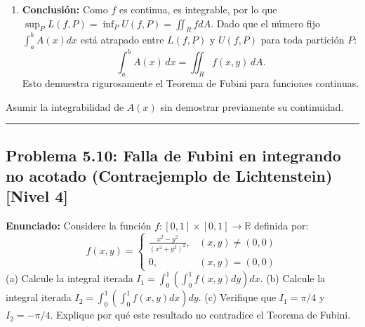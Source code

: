 \documentclass[11pt,a4paper]{article}
\begin{document}
\begin{enumerate}[label=\textbf{\arabic*.}]
\item \textbf{Conclusión:}
Como $f$ es continua, es integrable, por lo que $\sup_P L(f, P) = \inf_P U(f, P) = \iint_R f dA$.
Dado que el número fijo $\int_a^b A(x) dx$ está atrapado entre $L(f,P)$ y $U(f,P)$ para toda partición $P$:
\begin{equation*}
\int_a^b A(x) \, dx = \iint_R f(x,y) \, dA.
\end{equation*}
Esto demuestra rigurosamente el Teorema de Fubini para funciones continuas.
\end{enumerate}

\begin{trapbox}
Asumir la integrabilidad de $A(x)$ sin demostrar previamente su continuidad.
\end{trapbox}

\vspace{0.5cm}
\hrule
\vspace{0.5cm}

\subsection*{Problema 5.10: Falla de Fubini en integrando no acotado (Contraejemplo de Lichtenstein) \hfill \color{primaryblue}\small[Nivel 4]}

\begin{tcolorbox}[colback=white,colframe=gray!40,arc=1mm,boxrule=0.5pt,left=3mm,right=3mm,top=2mm,bottom=2mm]
\textbf{Enunciado:} Considere la función $f: [0, 1] \times [0, 1] \to \mathbb{R}$ definida por:
\begin{equation*}
f(x,y) = \begin{cases} \frac{x^2 - y^2}{(x^2 + y^2)^2}, & (x,y) \neq (0,0) \\ 0, & (x,y) = (0,0) \end{cases}
\end{equation*}
(a) Calcule la integral iterada $I_1 = \int_0^1 \left(\int_0^1 f(x,y) dy\right) dx$.
(b) Calcule la integral iterada $I_2 = \int_0^1 \left(\int_0^1 f(x,y) dx\right) dy$.
(c) Verifique que $I_1 = \pi/4$ y $I_2 = -\pi/4$. Explique por qué este resultado no contradice el Teorema de Fubini.
\end{tcolorbox}
\end{document}
